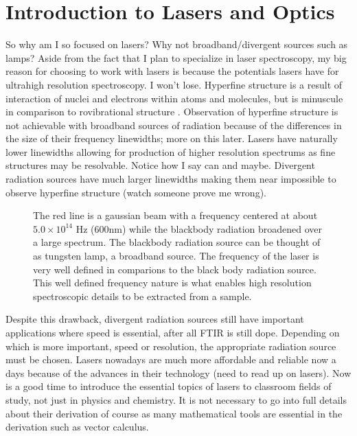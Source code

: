 \documentclass[11pt,a4paper]{book}
\newcommand{\imginput}[1]{} %
\begin{document}
	\section{Introduction to Lasers and Optics}	
		\label{sec:Introduction to Lasers and Optics}
		So why am I so focused on lasers? Why not broadband/divergent sources such as lamps? Aside from the fact that I plan to specialize in laser spectroscopy, my big reason for choosing to work with lasers is because the potentials lasers have for ultrahigh resolution spectroscopy. I won't lose. Hyperfine structure is a result of interaction of nuclei and electrons within atoms and molecules, but is minuscule in comparison to rovibrational structure . Observation of hyperfine structure is not achievable with broadband sources of radiation because of the differences in the size of their frequency linewidths; more on this later. Lasers have naturally lower linewidths allowing for production of higher resolution spectrums as fine structures may be resolvable. Notice how I say can and maybe. Divergent radiation sources have much larger linewidths making them near impossible to observe hyperfine structure (watch someone prove me wrong). 
		
		\begin{figure} [!ht]
			\centering
			\def\svgwidth{\columnwidth}
			\resizebox{12cm}{!}{\imginput{images/linewidths-gaus-blackbody.pdf_tex}}
			\caption{The red line is a gaussian beam with a frequency centered at about $5.0 \times 10 ^ {14}$ Hz  (600nm) while the blackbody radiation broadened over a large spectrum. The blackbody radiation source can be thought of as tungsten lamp, a broadband source. The frequency of the laser is very well defined in comparions to the black body radiation source. This well defined frequency nature is what enables high resolution spectroscopic details to be extracted from a sample.}
			\label{fig:linewidths-gaus-blackbody}
		\end{figure}
				
		Despite this drawback, divergent radiation sources still have important applications where speed is essential, after all FTIR is still dope. Depending on which is more important, speed or resolution, the appropriate radiation source must be chosen. Lasers nowadays are much more affordable and reliable now a days because of the advances in their technology (need to read up on lasers). Now is a good time to introduce the essential topics of lasers to classroom fields of study, not just in physics and chemistry. It is not necessary to go into full details about their derivation of course as many mathematical tools are essential in the derivation such as vector calculus.
		
\end{document}
